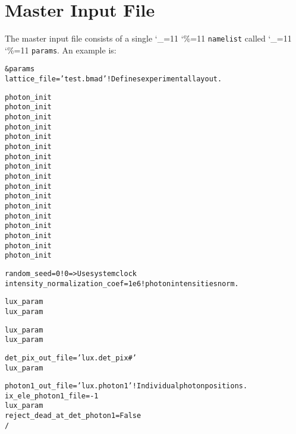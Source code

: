 \documentclass[11pt]{article}
\newcommand\ttcmd{\begingroup\catcode`\_=11 \catcode`\%=11 \dottcmd}
\newcommand\dottcmd[1]{\texttt{#1}\endgroup}
\newcommand{\vn}{\ttcmd}
\newenvironment{example}
  {\vspace{\ExBeg} \begin{alltt}}
  {\end{alltt} \vspace{\ExEnd}}
\newlength{\ExBeg}
\newlength{\ExEnd}
\begin{document}
\section{Master Input File} 
\label{s:master.file}

The master input file consists of a single \vn{namelist} called \vn{params}.
An example is:
\begin{example}
  &params
    lattice_file = 'test.bmad'                     ! Defines experimental layout.

    photon_init%
    photon_init%
    photon_init%
    photon_init%
    photon_init%
    photon_init%
    photon_init%
    photon_init%
    photon_init%
    photon_init%
    photon_init%
    photon_init%
    photon_init%
    photon_init%
    photon_init%
    photon_init%
    photon_init%

    random_seed = 0                                ! 0 => Use system clock
    intensity_normalization_coef = 1e6             ! photon intensities norm.

    lux_param%
    lux_param%

    lux_param%
    lux_param%

    det_pix_out_file = 'lux.det_pix#'
    lux_param%

    photon1_out_file = 'lux.photon1'               ! Individual photon positions.
    ix_ele_photon1_file = -1
    lux_param%
    reject_dead_at_det_photon1 = False
  /
\end{example}
\end{document}
